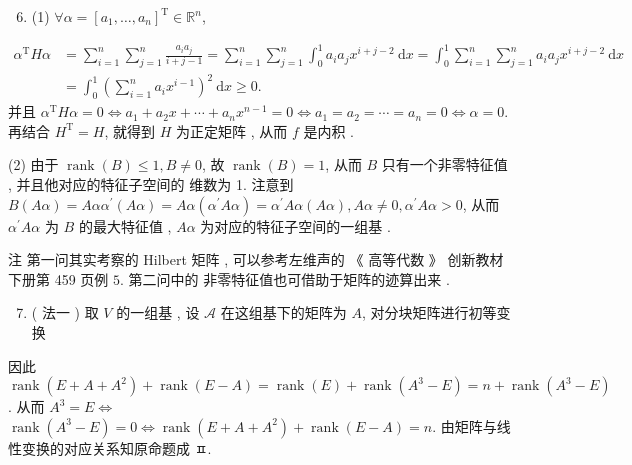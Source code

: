 \documentclass[10pt]{article}
\begin{document}
\begin{enumerate}
  \setcounter{enumi}{5}
  \item (1) $\forall \alpha=\left[a_{1}, \ldots, a_{n}\right]^{\mathrm{T}} \in \mathbb{R}^{n}$,
\end{enumerate}
$$
\begin{aligned}
\alpha^{\mathrm{T}} H \alpha &=\sum_{i=1}^{n} \sum_{j=1}^{n} \frac{a_{i} a_{j}}{i+j-1}=\sum_{i=1}^{n} \sum_{j=1}^{n} \int_{0}^{1} a_{i} a_{j} x^{i+j-2} \mathrm{~d} x=\int_{0}^{1} \sum_{i=1}^{n} \sum_{j=1}^{n} a_{i} a_{j} x^{i+j-2} \mathrm{~d} x \\
&=\int_{0}^{1}\left(\sum_{i=1}^{n} a_{i} x^{i-1}\right)^{2} \mathrm{~d} x \geqslant 0 .
\end{aligned}
$$
 并且  $\alpha^{\mathrm{T}} H \alpha=0 \Longleftrightarrow a_{1}+a_{2} x+\cdots+a_{n} x^{n-1}=0 \Longleftrightarrow a_{1}=a_{2}=\cdots=a_{n}=0 \Longleftrightarrow \alpha=0$.  再结合  $H^{\mathrm{T}}=H$,  就得到  $H$  为正定矩阵 ,  从而  $f$  是内积 .

(2)  由于  $\operatorname{rank}(B) \leqslant 1, B \neq 0$,  故  $\operatorname{rank}(B)=1$,  从而  $B$  只有一个非零特征值 ,  并且他对应的特征子空间的   维数为  1.  注意到  $B(A \alpha)=A \alpha \alpha^{\prime}(A \alpha)=A \alpha\left(\alpha^{\prime} A \alpha\right)=\alpha^{\prime} A \alpha(A \alpha), A \alpha \neq 0, \alpha^{\prime} A \alpha>0$,  从而  $\alpha^{\prime} A \alpha$  为  $B$  的最大特征值 , $A \alpha$  为对应的特征子空间的一组基 .

 注   第一问其实考察的  Hilbert  矩阵 ,  可以参考左维声的 《 高等代数 》 创新教材下册第  459  页例  $5 .$  第二问中的   非零特征值也可借助于矩阵的迹算出来 .

\begin{enumerate}
  \setcounter{enumi}{6}
  \item ( 法一 )  取  $V$  的一组基 ,  设  $\mathscr{A}$  在这组基下的矩阵为  $A$,  对分块矩阵进行初等变换 
\end{enumerate}
 因此  $\operatorname{rank}\left(E+A+A^{2}\right)+\operatorname{rank}(E-A)=\operatorname{rank}(E)+\operatorname{rank}\left(A^{3}-E\right)=n+\operatorname{rank}\left(A^{3}-E\right)$.  从而  $A^{3}=E \Longleftrightarrow$ $\operatorname{rank}\left(A^{3}-E\right)=0 \Longleftrightarrow \operatorname{rank}\left(E+A+A^{2}\right)+\operatorname{rank}(E-A)=n$.  由矩阵与线性变换的对应关系知原命题成  ㅍ.
\end{document}

